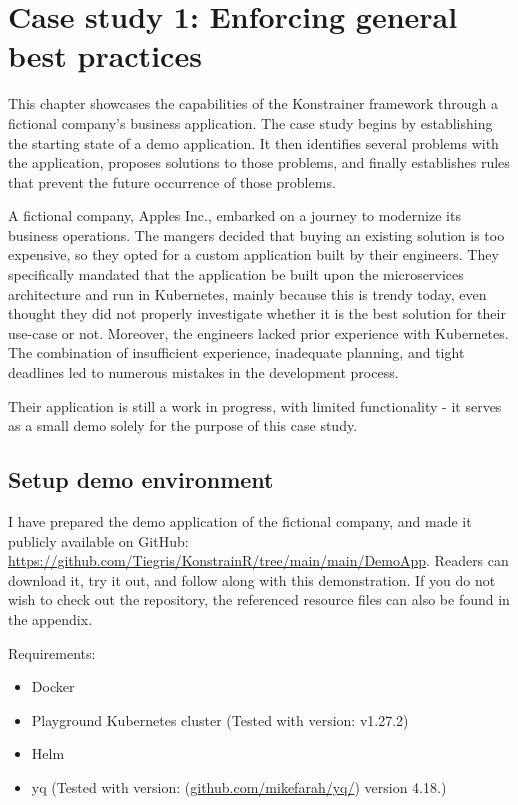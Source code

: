 \chapter{Case study 1: Enforcing general best practices}
\label{chap:case_study1}

This chapter showcases the capabilities of the Konstrainer framework through a fictional company's business application. The case study begins by establishing the starting state of a demo application. It then identifies several problems with the application, proposes solutions to those problems, and finally establishes rules that prevent the future occurrence of those problems.

A fictional company, Apples Inc., embarked on a journey to modernize its business operations. The mangers decided that buying an existing solution is too expensive, so they opted for a custom application built by their engineers. They specifically mandated that the application be built upon the microservices architecture and run in Kubernetes, mainly because this is trendy today, even thought they did not properly investigate whether it is the best solution for their use-case or not. Moreover, the engineers lacked prior experience with Kubernetes. The combination of insufficient experience, inadequate planning, and tight deadlines led to numerous mistakes in the development process.

Their application is still a work in progress, with limited functionality - it serves as a small demo solely for the purpose of this case study.

\section{Setup demo environment}

I have prepared the demo application of the fictional company, and made it publicly available on GitHub:
\url{https://github.com/Tiegris/KonstrainR/tree/main/main/DemoApp}.
Readers can download it, try it out, and follow along with this demonstration. If you do not wish to check out the repository, the referenced resource files can also be found in the appendix.

Requirements:

\begin{itemize}
    \item Docker
    \item Playground Kubernetes cluster (Tested with version: v1.27.2)
    \item Helm
    \item yq (Tested with version: (\url{github.com/mikefarah/yq/}) version 4.18.)
\end{itemize}

